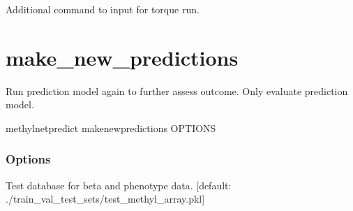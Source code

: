 \documentclass[letterpaper,10pt,english]{sphinxmanual}
\begin{document}
\begin{fulllineitems}
\label{\detokenize{index:cmdoption-methylnet-predict-launch-hyperparameter-scan-a}}
Additional command to input for torque run.

\end{fulllineitems}



\section{make\_new\_predictions}
\label{\detokenize{index:methylnet-predict-make-new-predictions}}
Run prediction model again to further assess outcome. Only evaluate prediction model.

\begin{sphinxVerbatim}[commandchars=\\\{\}]
methylnet\PYGZhy{}predict make\PYGZus{}new\PYGZus{}predictions \PYG{o}{[}OPTIONS\PYG{o}{]}
\end{sphinxVerbatim}
\subsubsection*{Options}

\begin{fulllineitems}
\label{\detokenize{index:cmdoption-methylnet-predict-make-new-predictions-tp}}
Test database for beta and phenotype data.  {[}default: ./train\_val\_test\_sets/test\_methyl\_array.pkl{]}

\end{fulllineitems}
\end{document}
